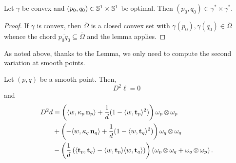 \documentclass[11pt]{amsart}
\begin{document}
\begin{cor}
\label{cor:convex_regular}

Let \(\gamma\) be convex and \((p_0,q_0) \in \mathbb{S}^1 \times \mathbb{S}^1\) be optimal. Then \((p_0, q_0) \in \gamma^{\ast} \times \gamma^{\ast}\).
\end{cor}

\begin{proof}
If $\gamma$ is convex, then $\overline{\Omega}$ is a closed convex set with $\gamma(p_0), \gamma(q_0) \in \overline{\Omega}$ whence the chord $\overline{p_0q_0} \subseteq \overline{\Omega}$ and the lemma applies.
\end{proof}

As noted above, thanks to the Lemma, we only need to compute the second variation at smooth points.

\begin{lemma}
\label{lem:secondvar}
Let \((p,q)\) be a smooth point. Then,
\[
D^2 \ell = 0
\]
and
\[
\begin{split}
D^2d &= \left(\langle{w},{\operatorname{\kappa}_p \operatorname{\mathbf{n}}_p}\rangle + \frac{1}{d}(1 - \langle{w},{\operatorname{\mathbf{t}}_p}\rangle^2) \right) \omega_p \operatorname{\otimes} \omega_p \\
&+ \left(-\langle{w},{\operatorname{\kappa}_q \operatorname{\mathbf{n}}_q}\rangle + \frac{1}{d}(1 - \langle{w},{\operatorname{\mathbf{t}}_q}\rangle^2) \right) \omega_q \operatorname{\otimes} \omega_q \\
&- \left(\frac{1}{d}\left(\langle{\operatorname{\mathbf{t}}_p},{\operatorname{\mathbf{t}}_q}\rangle - \langle{w},{\operatorname{\mathbf{t}}_p}\rangle\langle{w},{\operatorname{\mathbf{t}}_q}\rangle\right) \right) \left(\omega_p \operatorname{\otimes} \omega_q + \omega_q \operatorname{\otimes} \omega_p\right).
\end{split}
\]
\end{lemma}
\end{document}
